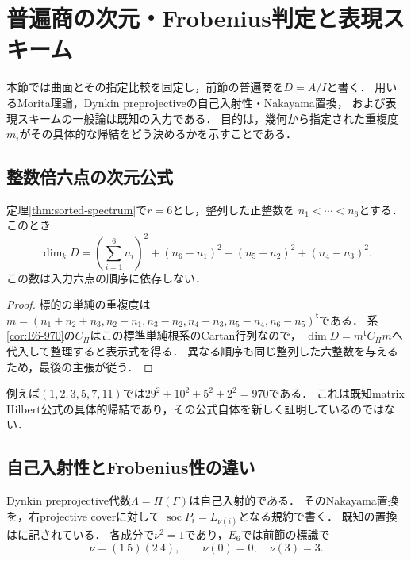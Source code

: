 \section{普遍商の次元・Frobenius判定と表現スキーム}\label{sec:finite-rep-geometry}
本節では曲面とその指定比較を固定し，前節の普遍商を$D=A/I$と書く．
用いるMorita理論，Dynkin preprojectiveの自己入射性・Nakayama置換，
および表現スキームの一般論は既知の入力である．
目的は，幾何から指定された重複度$m_i$がその具体的な帰結をどう決めるかを示すことである．

\subsection{整数倍六点の次元公式}
\begin{corollary}[整列した六整数による普遍商の次元]\label{cor:E6-dimension-formula}
定理\ref{thm:sorted-spectrum}で$r=6$とし，整列した正整数を
$n_1<\cdots<n_6$とする．このとき
\[
 \boxed{\dim_kD=
 \left(\sum_{i=1}^6n_i\right)^2
 +(n_6-n_1)^2+(n_5-n_2)^2+(n_4-n_3)^2.}
\]
この数は入力六点の順序に依存しない．
\end{corollary}
\begin{proof}
標的の単純の重複度は
$m=(n_1+n_2+n_3,n_2-n_1,n_3-n_2,n_4-n_3,n_5-n_4,n_6-n_5)^{\mathsf t}$である．
系\ref{cor:E6-970}の$C_\Pi$はこの標準単純根系のCartan行列なので，
$\dim D=m^{\mathsf t}C_\Pi m$へ代入して整理すると表示式を得る．
異なる順序も同じ整列した六整数を与えるため，最後の主張が従う．
\end{proof}
例えば$(1,2,3,5,7,11)$では$29^2+10^2+5^2+2^2=970$である．
これは既知matrix Hilbert公式の具体的帰結であり，その公式自体を新しく証明しているのではない．

\subsection{自己入射性とFrobenius性の違い}
Dynkin preprojective代数$\Lambda=\Pi(\Gamma)$は自己入射的である．
そのNakayama置換を，右projective coverに対して
$\operatorname{soc}P_i=L_{\nu(i)}$となる規約で書く．
既知の置換は\cite[\S3A]{AiharaMizuno}に記されている．
各成分で$\nu^2=1$であり，$E_6$では前節の標識で
\[
 \nu=(1\ 5)(2\ 4),\qquad \nu(0)=0,\quad\nu(3)=3.
\]

